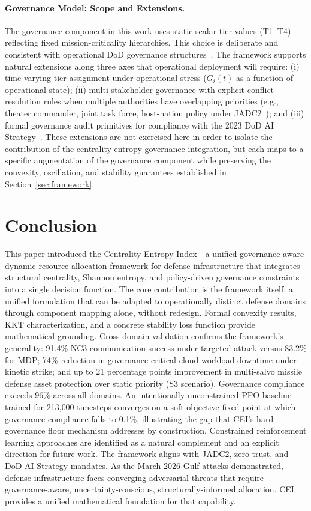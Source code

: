 \documentclass[runningheads]{llncs}
\begin{document}
\paragraph{Governance Model: Scope and Extensions.} The governance component in this work uses static scalar tier values (T1--T4) reflecting fixed mission-criticality hierarchies. This choice is deliberate and consistent with operational DoD governance structures~\cite{dod_ai,nds2022}. The framework supports natural extensions along three axes that operational deployment will require: (i) time-varying tier assignment under operational stress ($G_i(t)$ as a function of operational state); (ii) multi-stakeholder governance with explicit conflict-resolution rules when multiple authorities have overlapping priorities (e.g., theater commander, joint task force, host-nation policy under JADC2~\cite{jadc2}); and (iii) formal governance audit primitives for compliance with the 2023 DoD AI Strategy~\cite{dod_ai}. These extensions are not exercised here in order to isolate the contribution of the centrality-entropy-governance integration, but each maps to a specific augmentation of the governance component while preserving the convexity, oscillation, and stability guarantees established in Section~\ref{sec:framework}.

\section{Conclusion}
\label{sec:conclusion}

This paper introduced the Centrality-Entropy Index---a unified governance-aware dynamic resource allocation framework for defense infrastructure that integrates structural centrality, Shannon entropy, and policy-driven governance constraints into a single decision function. The core contribution is the framework itself: a unified formulation that can be adapted to operationally distinct defense domains through component mapping alone, without redesign. Formal convexity results, KKT characterization, and a concrete stability loss function provide mathematical grounding. Cross-domain validation confirms the framework's generality: 91.4\% NC3 communication success under targeted attack versus 83.2\% for MDP; 74\% reduction in governance-critical cloud workload downtime under kinetic strike; and up to 21 percentage points improvement in multi-salvo missile defense asset protection over static priority (S3 scenario). Governance compliance exceeds 96\% across all domains. An intentionally unconstrained PPO baseline trained for 213{,}000 timesteps converges on a soft-objective fixed point at which governance compliance falls to 0.1\%, illustrating the gap that CEI's hard governance floor mechanism addresses by construction. Constrained reinforcement learning approaches are identified as a natural complement and an explicit direction for future work. The framework aligns with JADC2, zero trust, and DoD AI Strategy mandates. As the March 2026 Gulf attacks demonstrated, defense infrastructure faces converging adversarial threats that require governance-aware, uncertainty-conscious, structurally-informed allocation. CEI provides a unified mathematical foundation for that capability.
\end{document}
